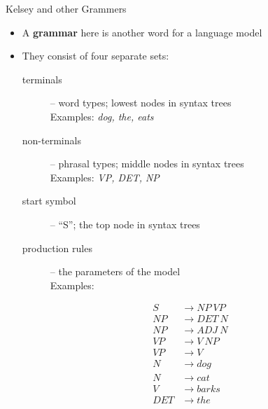 \documentclass[xcolor=pdftex,x11names,table,hyperref]{beamer}
\begin{document}
\begin{frame}{Kelsey and other Grammers}
\begin{itemize}
	\item A \textbf{grammar} here is another word for a language model
	\item They consist of four separate sets:
		\begin{description}
			\item[terminals] -- word types; lowest nodes in syntax trees \\ Examples: \textit{dog, the, eats}
			\item[non-terminals] -- phrasal types;  middle nodes in syntax trees \\ Examples: \textit{VP, DET, NP}
			\item[start symbol] -- ``S''; the top node in syntax trees
			\pause
		\item[production rules] -- the parameters of the model \\ Examples:
		\end{description}
		\vspace{-1.0em}
		\begin{footnotesize}
		\begin{spacing}{0.6}
		\begin{align*}
			S & \rightarrow NP \ VP \\
			NP & \rightarrow DET \ N \\
			NP & \rightarrow ADJ \ N \\
			VP & \rightarrow V \ NP \\
			VP & \rightarrow V \\
			N & \rightarrow dog \\
			N & \rightarrow cat \\
			V & \rightarrow barks \\
			DET & \rightarrow the \\
		\end{align*}
		\end{spacing}
		\end{footnotesize}
\end{itemize}
\end{frame}
\end{document}
